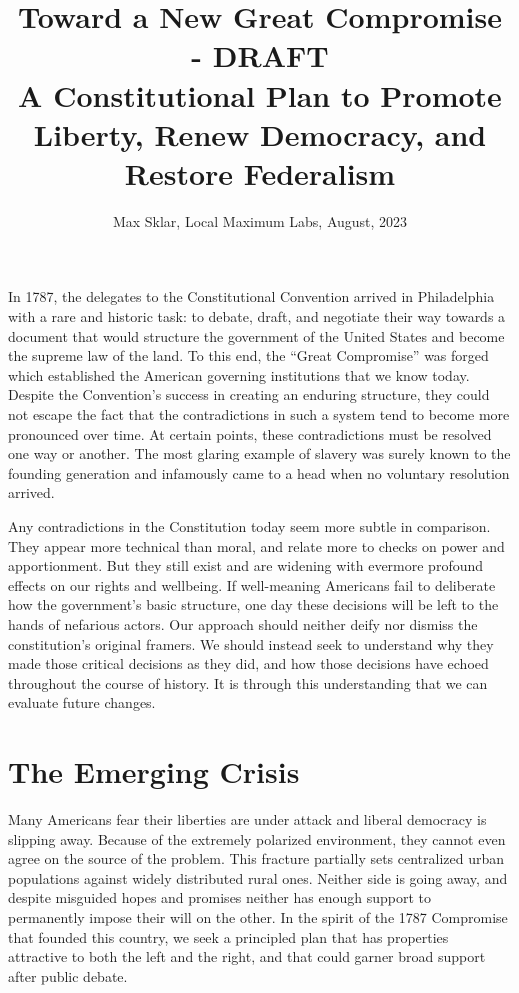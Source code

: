 \documentclass{article}
\newcommand{\quotes}[1]{``#1''}
\begin{document}
\parindent=0in
\parskip=12pt

\title{
  Toward a New Great Compromise - DRAFT \\
  \large{
    A Constitutional Plan to Promote Liberty, Renew Democracy, and Restore Federalism
  }
}

\author{Max Sklar, Local Maximum Labs, August, 2023}
\date{}

\maketitle

In 1787, the delegates to the Constitutional Convention arrived in Philadelphia with a rare and historic task: to debate, draft, and negotiate their way towards a document that would structure the government of the United States and become the supreme law of the land. To this end, the \quotes{Great Compromise} was forged which established the American governing institutions that we know today. Despite the Convention's success in creating an enduring structure, they could not escape the fact that the contradictions in such a system tend to become more pronounced over time. At certain points, these contradictions must be resolved one way or another. The most glaring example of slavery was surely known to the founding generation and infamously came to a head when no voluntary resolution arrived.

Any contradictions in the Constitution today seem more subtle in comparison. They appear more technical than moral, and relate more to checks on power and apportionment. But they still exist and are widening with evermore profound effects on our rights and wellbeing. If well-meaning Americans fail to deliberate how the government's basic structure, one day these decisions will be left to the hands of nefarious actors. Our approach should neither deify nor dismiss the constitution's original framers. We should instead seek to understand why they made those critical decisions as they did, and how those decisions have echoed throughout the course of history. It is through this understanding that we can evaluate future changes.

\section{The Emerging Crisis}

Many Americans fear their liberties are under attack and liberal democracy is slipping away. Because of the extremely polarized environment, they cannot even agree on the source of the problem. This fracture partially sets centralized urban populations against widely distributed rural ones. Neither side is going away, and despite misguided hopes and promises neither has enough support to permanently impose their will on the other. In the spirit of the 1787 Compromise that founded this country, we seek a principled plan that has properties attractive to both the left and the right, and that could garner broad support after public debate.
\end{document}
